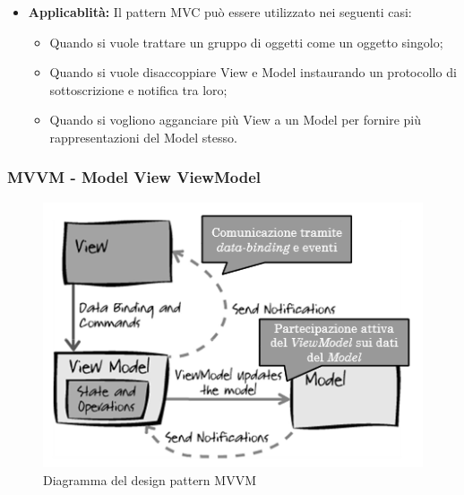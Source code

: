 \begin{itemize}
\item \textbf{Applicablità:} Il pattern MVC può essere utilizzato nei seguenti casi:

\begin{itemize}
\item Quando si vuole trattare un gruppo di oggetti come un oggetto singolo;
\item Quando si vuole disaccoppiare View e Model instaurando un protocollo di sottoscrizione e notifica tra loro;
\item Quando si vogliono agganciare più View a un Model per fornire più rappresentazioni del Model stesso.
\end{itemize}

\end{itemize}

\subsubsection{MVVM - Model View ViewModel}

\begin{figure}[h]
\begin{center}
\includegraphics[scale=0.5]{img/MVVM.png}
\caption{Diagramma del design pattern MVVM}
\end{center}
\end{figure}

